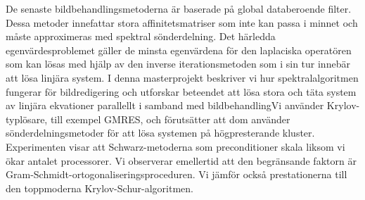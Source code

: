 De senaste bildbehandlingsmetoderna är baserade på global databeroende filter.
Dessa metoder innefattar stora affinitetsmatriser som inte kan passa i minnet och måste approximeras med spektral sönderdelning.
Det härledda egenvärdesproblemet gäller de minsta egenvärdena för den laplaciska operatören som kan lösas med hjälp av den inverse iterationsmetoden som i sin tur innebär att lösa linjära system.
I denna masterprojekt beskriver vi hur spektralalgoritmen fungerar för bildredigering och utforskar beteendet att lösa stora och täta system av linjära ekvationer parallellt i samband med bildbehandlingVi använder Krylov-typlösare, till exempel GMRES, och förutsätter att dom använder sönderdelningsmetoder för att lösa systemen på högpresterande kluster.
Experimenten visar att Schwarz-metoderna som preconditioner skala liksom vi ökar antalet processorer.
Vi observerar emellertid att den begränsande faktorn är Gram-Schmidt-ortogonaliseringsproceduren.
Vi jämför också prestationerna till den toppmoderna Krylov-Schur-algoritmen.
